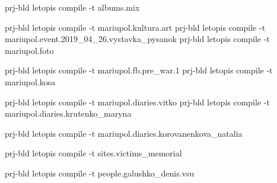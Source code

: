  
 
 
 
 

prj-bld letopis compile -t albums.mix

prj-bld letopis compile -t mariupol.kultura.art
prj-bld letopis compile -t mariupol.event.2019_04_26.vystavka_pysanok
prj-bld letopis compile -t mariupol.foto

prj-bld letopis compile -t mariupol.fb.pre_war.1
prj-bld letopis compile -t mariupol.kosa

prj-bld letopis compile -t mariupol.diaries.vitko
prj-bld letopis compile -t mariupol.diaries.krutenko_maryna

prj-bld letopis compile -t mariupol.diaries.korovanenkova_natalia

prj-bld letopis compile -t sites.victims_memorial

prj-bld letopis compile -t people.galushko_denis.vsu

